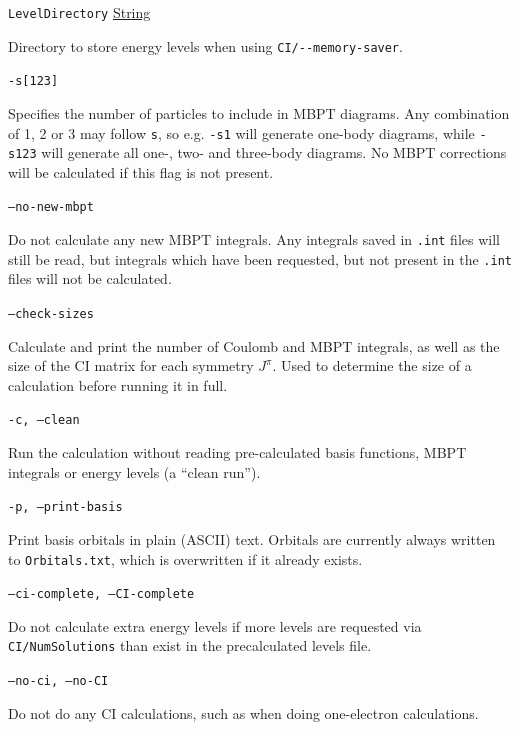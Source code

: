 \documentclass{report}
\begin{document}
\texttt{LevelDirectory} \uline{String}
\begin{adjustwidth}{1cm}{}
Directory to store energy levels when using \texttt{CI/{-}{-}memory-saver}.
\end{adjustwidth}

\texttt{-s[123]} 
\begin{adjustwidth}{1cm}{} 
Specifies the number of particles to include in MBPT diagrams. Any combination of 1, 2 or 3 may follow 
\texttt{s}, so e.g. \texttt{-s1} will generate one-body diagrams, while \texttt{-s123} will generate all 
one-, two- and three-body diagrams. No MBPT corrections will be calculated if this flag is not present.
\end{adjustwidth}

\texttt{--no-new-mbpt}
\begin{adjustwidth}{1cm}{} 
Do not calculate any new MBPT integrals. Any integrals saved in \texttt{.int} files will still be read, 
but integrals which have been requested, but not present in the \texttt{.int} files will not be
calculated.
\end{adjustwidth}

\texttt{--check-sizes}
\begin{adjustwidth}{1cm}{}
Calculate and print the number of Coulomb and MBPT integrals, as well as the size of the CI matrix for
each symmetry $J^{\pi}$. Used to determine the size of a calculation before running it in full.
\end{adjustwidth}

\texttt{-c, --clean}
\begin{adjustwidth}{1cm}{}
Run the calculation without reading pre-calculated basis functions, MBPT integrals or energy levels (a
``clean run'').
\end{adjustwidth}

\texttt{-p, --print-basis}
\begin{adjustwidth}{1cm}{}
Print basis orbitals in plain (ASCII) text. Orbitals are currently always written to
\texttt{Orbitals.txt}, which is overwritten if it already exists.
\end{adjustwidth}

\texttt{--ci-complete, --CI-complete}
\begin{adjustwidth}{1cm}{}
Do not calculate extra energy levels if more levels are requested via \texttt{CI/NumSolutions} than
exist in the precalculated levels file.
\end{adjustwidth}

\texttt{--no-ci, --no-CI}
\begin{adjustwidth}{1cm}{}
Do not do any CI calculations, such as when doing one-electron calculations.
\end{adjustwidth}
\end{document}
